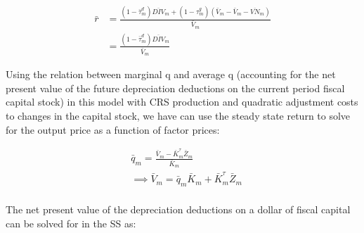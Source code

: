 \documentclass[letterpaper,12pt]{article}
\theoremstyle{definition}
\begin{document}
\begin{spacing}{1.5}
\begin{equation}
\begin{split}
\bar{r} &= \frac{(1-\bar{\tau}^{d}_{m})\overline{DIV}_{m} + (1-\tau^{g}_{m})\left(\bar{V}_{m}-\bar{V}_{m}-\overline{VN}_{m}\right)}{\bar{V}_{m}}\\
& =  \frac{(1-\bar{\tau}^{d}_{m})\overline{DIV}_{m}}{\bar{V}_{m}}
\end{split}
\end{equation}

Using the relation between marginal q and average q (accounting for the net present value of the future depreciation deductions on the current period fiscal capital stock) in this model with CRS production and quadratic adjustment costs to changes in the capital stock, we have can use the steady state return to solve for the output price as a function of factor prices:

 \begin{equation}
\begin{split}
& \bar{q}_{m} = \frac{\bar{V}_{m}- \bar{K}^{\tau}_{m}\bar{Z}_{m}}{\bar{K}_{m}} \\
& \implies \bar{V}_{m} = \bar{q}_{m}\bar{K}_{m}+ \bar{K}^{\tau}_{m}\bar{Z}_{m} \\
\end{split}
\end{equation}

The net present value of the depreciation deductions on a dollar of fiscal capital can be solved for in the SS as:


\end{spacing}
\end{document}
